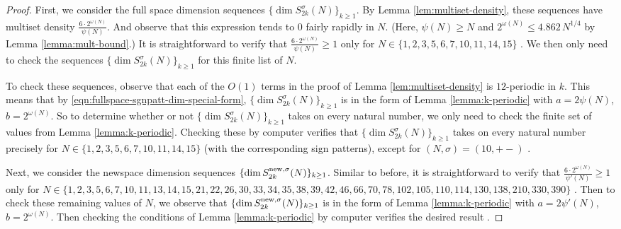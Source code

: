 \documentclass[12pt,letterpaper,reqno]{amsart}
\theoremstyle{definition}
\numberwithin{equation}{section}
\numberwithin{figure}{section}
\numberwithin{table}{section}
\newcommand{\nw}{{\textnormal{new}}}
\begin{document}
\begin{proof}
    First, we consider the full space dimension sequences $\{ \dim S_{2k}^\sigma(N) \}_{k\ge1}$. By Lemma \ref{lem:multiset-density}, these sequences have multiset density $\frac{6 \cdot 2^{\omega(N)}}{\psi(N)}$. And observe that this expression tends to $0$ fairly rapidly in $N$. (Here, $\psi(N) \ge N$ and $2^{\omega(N)} \le 4.862\, N^{1/4}$ by Lemma \ref{lemma:mult-bound}.)  It is straightforward to verify that $\frac{6 \cdot 2^{\omega(N)}}{\psi(N)} \ge 1$ only for $N \in \{1, 2, 3, 5, 6, 7, 10, 11, 14, 15\}$ \cite{ross-code}.
    We then only need to check the sequences $\{ \dim S_{2k}^\sigma(N) \}_{k\ge1}$  for this finite list of $N$. 
    
    To check these sequences, observe that each of the $O(1)$ terms in the proof of Lemma \ref{lem:multiset-density} is $12$-periodic in $k$. This means that by \eqref{eqn:fullspace-sgnpatt-dim-special-form}, $\{ \dim S_{2k}^\sigma(N) \}_{k\ge1}$ is in the form of Lemma \ref{lemma:k-periodic} with $a=2 \psi(N)$, $b = 2^{\omega(N)}$. So to determine whether or not $\{ \dim S_{2k}^\sigma(N) \}_{k\ge1}$ takes on every natural number, we only need to check the finite set of values from Lemma \ref{lemma:k-periodic}. Checking these by computer verifies that $\{ \dim S_{2k}^\sigma(N) \}_{k\ge1}$ takes on every natural number precisely for $N \in \{1, 2, 3, 5, 6, 7, 10, 11, 14, 15\}$ (with the corresponding sign patterns), except for $(N,\sigma)=(10,+-)$ \cite{ross-code}. 

    Next, we consider the newspace dimension sequences $\{ \dim S_{2k}^{\nw,\sigma}(N) \}_{k\ge1}$. Similar to before, it is straightforward to verify that $\frac{6 \cdot 2^{\omega(N)}}{\psi'(N)} \ge 1$ only for $N \in \{1,\allowbreak 2,\allowbreak 3,\allowbreak 5,\allowbreak 6,\allowbreak 7,\allowbreak 10,\allowbreak 11,\allowbreak 13,\allowbreak 14,\allowbreak 15,\allowbreak 21,\allowbreak 22,\allowbreak 26,\allowbreak 30,\allowbreak 33,\allowbreak 34,\allowbreak 35,\allowbreak 38,\allowbreak 39,\allowbreak 42,\allowbreak 46,\allowbreak 66,\allowbreak 70,\allowbreak 78,\allowbreak 102,\allowbreak 105,\allowbreak 110,\allowbreak 114,\allowbreak 130,\allowbreak 138,\allowbreak 210,\allowbreak 330,\allowbreak 390\}$ \cite{ross-code}. Then to check these remaining values of $N$, we observe that $\{ \dim S_{2k}^{\nw,\sigma}(N) \}_{k\ge1}$ is in the form of Lemma \ref{lemma:k-periodic} with $a=2 \psi'(N)$, $b = 2^{\omega(N)}$. Then checking the conditions of Lemma \ref{lemma:k-periodic} by computer verifies the desired result \cite{ross-code}.
\end{proof}
\end{document}
